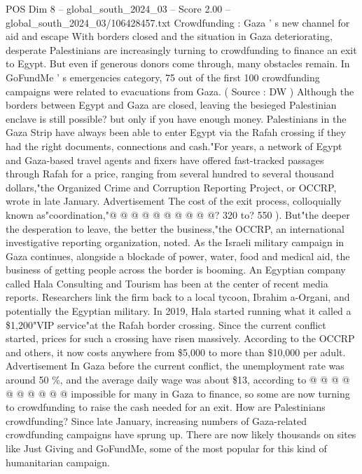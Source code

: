 \begin{textsample}{POS Dim 8 – global\_south\_2024\_03 – Score 2.00 – global\_south\_2024\_03/106428457.txt}  \label{ex:f8_pos_429}
Crowdfunding : Gaza ' s new channel for aid and escape With borders closed and the situation in Gaza deteriorating, desperate Palestinians are increasingly turning to crowdfunding to finance an exit to Egypt.
But even if generous donors come through, many obstacles remain.
In GoFundMe ' s emergencies category, 75 out of the first 100 crowdfunding campaigns were related to evacuations from Gaza. ( Source : DW ) Although the borders between Egypt and Gaza are closed, leaving the besieged Palestinian enclave is still possible? but only if you have enough money.
Palestinians in the Gaza Strip have always been able to enter Egypt via the Rafah crossing if they had the right documents, connections and cash."For years, a network of Egypt and Gaza-based travel agents and fixers have offered fast-tracked passages through Rafah for a price, ranging from several hundred to several thousand dollars,"the Organized Crime and Corruption Reporting Project, or OCCRP, wrote in late January.
Advertisement The cost of the exit process, colloquially known as"coordination,"@ @ @ @ @ @ @ @ @ @? 320 to? 550 ).
But"the deeper the desperation to leave, the better the business,"the OCCRP, an international investigative reporting organization, noted.
As the Israeli military campaign in Gaza continues, alongside a blockade of power, water, food and medical aid, the business of getting people across the border is booming.
An Egyptian company called Hala Consulting and Tourism has been at the center of recent media reports.
Researchers link the firm back to a local tycoon, Ibrahim a-Organi, and potentially the Egyptian military.
In 2019, Hala started running what it called a \$1,200"VIP service"at the Rafah border crossing.
Since the current conflict started, prices for such a crossing have risen massively.
According to the OCCRP and others, it now costs anywhere from \$5,000 to more than \$10,000 per adult.
Advertisement In Gaza before the current conflict, the unemployment rate was around 50 \%, and the average daily wage was about \$13, according to @ @ @ @ @ @ @ @ @ @ impossible for many in Gaza to finance, so some are now turning to crowdfunding to raise the cash needed for an exit.
How are Palestinians crowdfunding?
Since late January, increasing numbers of Gaza-related crowdfunding campaigns have sprung up.
There are now likely thousands on sites like Just Giving and GoFundMe, some of the most popular for this kind of humanitarian campaign.

\end{textsample}
